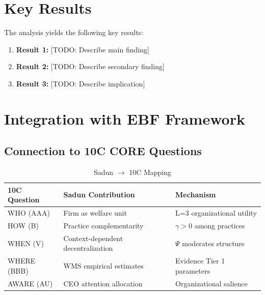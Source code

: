 
\section{Key Results}
\label{sec:results}

The analysis yields the following key results:

\begin{enumerate}
    \item \textbf{Result 1:} [TODO: Describe main finding]
    \item \textbf{Result 2:} [TODO: Describe secondary finding]
    \item \textbf{Result 3:} [TODO: Describe implication]
\end{enumerate}

\section{Integration with EBF Framework}

\subsection{Connection to 10C CORE Questions}

\begin{table}[htbp]
\centering
\caption{Sadun $\rightarrow$ 10C Mapping}
\label{tab:sadun-9c}
\renewcommand{\arraystretch}{1.3}
\begin{tabular}{@{}lll@{}}
\toprule
\textbf{10C Question} & \textbf{Sadun Contribution} & \textbf{Mechanism} \\
\midrule
WHO (AAA) & Firm as welfare unit & L=3 organizational utility \\
HOW (B) & Practice complementarity & $\gamma > 0$ among practices \\
WHEN (V) & Context-dependent decentralization & $\Psi$ moderates structure \\
WHERE (BBB) & WMS empirical estimates & Evidence Tier 1 parameters \\
AWARE (AU) & CEO attention allocation & Organizational salience \\
\bottomrule
\end{tabular}
\end{table}

